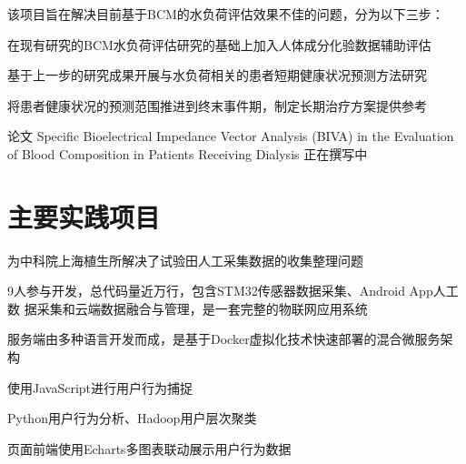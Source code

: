 \documentclass[]{deedy-resume-openfont}
\begin{document}
\begin{minipage}[t]{0.73\textwidth}
	\descript{}
    \begin{tightemize}
        \item 该项目旨在解决目前基于BCM的水负荷评估效果不佳的问题，分为以下三步：
        \vspace{\topsep}
        \begin{tightemize}
            \item 在现有研究的BCM水负荷评估研究的基础上加入人体成分化验数据辅助评估
            \item 基于上一步的研究成果开展与水负荷相关的患者短期健康状况预测方法研究
            \item 将患者健康状况的预测范围推进到终末事件期，制定长期治疗方案提供参考
        \end{tightemize}
        \vspace{\topsep}
		\item 论文 Specific Bioelectrical Impedance Vector Analysis (BIVA) in the Evaluation of Blood Composition in Patients Receiving Dialysis 正在撰写中
	\end{tightemize}
    \sectionsep

    \section{主要实践项目}
	\begin{tightemize}
		\item 为中科院上海植生所解决了试验田人工采集数据的收集整理问题
		\item 9人参与开发，总代码量近万行，包含STM32传感器数据采集、Android App人工数 据采集和云端数据融合与管理，是一套完整的物联网应用系统
		\item 服务端由多种语言开发而成，是基于Docker虚拟化技术快速部署的混合微服务架构
	\end{tightemize}
	\sectionsep

	\begin{tightemize}
		\item 使用JavaScript进行用户行为捕捉
		\item Python用户行为分析、Hadoop用户层次聚类
		\item 页面前端使用Echarts多图表联动展示用户行为数据
	\end{tightemize}
    \sectionsep
    

\end{minipage}
\end{document}
